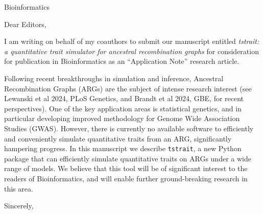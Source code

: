 \documentclass{letter}
\begin{document}
\begin{letter}{Bioinformatics}

\opening{Dear Editors,}

I am writing on behalf of my coauthors to submit our manuscript entitled
\emph{tstrait: a quantitative trait simulator for ancestral recombination graphs}
for consideration for publication in Bioinformatics
as an ``Application Note'' research article.

Following recent breakthroughs in simulation and inference,
Ancestral Recombination Graphs (ARGs) are the subject of
intense research interest (see Lewanski et al 2024, PLoS Genetics,
and Brandt et al 2024, GBE, for recent perspectives). One of the key application
areas is statistical genetics, and in particular developing
improved methodology for Genome Wide Association Studies (GWAS).
However, there is currently no available software to efficiently
and conveniently simulate quantitative traits from an ARG,
significantly hampering progress. In this manuscript we describe
\texttt{tstrait}, a new Python package that can efficiently
simulate quantitative traits on ARGs under a wide range of
models. We believe that this tool will be of significant interest
to the readers of Bioinformatics, and will enable further
ground-breaking research in this area.

\closing{Sincerely,}

\end{letter}
\end{document}
